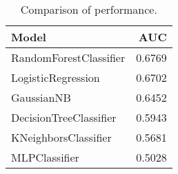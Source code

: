 \begin{table}[htpb]
\centering
\caption{Comparison of performance.}
\label{tab:performance}
\begin{tabular}{lr}
\toprule
                 Model &    AUC \\
\midrule
RandomForestClassifier & 0.6769 \\
    LogisticRegression & 0.6702 \\
            GaussianNB & 0.6452 \\
DecisionTreeClassifier & 0.5943 \\
  KNeighborsClassifier & 0.5681 \\
         MLPClassifier & 0.5028 \\
\bottomrule
\end{tabular}
\end{table}
